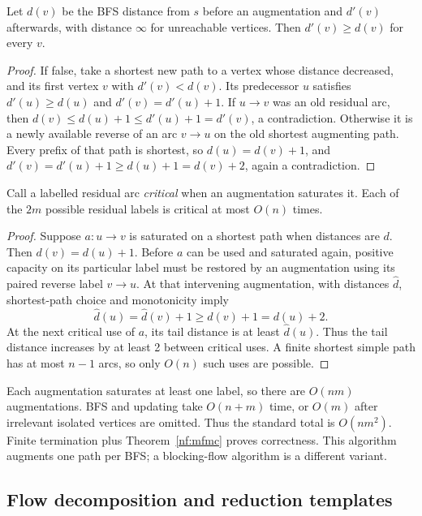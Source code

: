 \begin{lemma}\label{nf:distance}
Let $d(v)$ be the BFS distance from $s$ before an augmentation and $d'(v)$
afterwards, with distance $\infty$ for unreachable vertices. Then
$d'(v)\ge d(v)$ for every $v$.
\end{lemma}
\begin{proof}
If false, take a shortest new path to a vertex whose distance decreased,
and its first vertex $v$ with $d'(v)<d(v)$. Its predecessor $u$ satisfies
$d'(u)\ge d(u)$ and $d'(v)=d'(u)+1$. If $u\to v$ was an old residual arc,
then $d(v)\le d(u)+1\le d'(u)+1=d'(v)$, a contradiction.
Otherwise it is a newly available reverse of an arc $v\to u$ on the old
shortest augmenting path. Every prefix of that path is shortest, so
$d(u)=d(v)+1$, and
$d'(v)=d'(u)+1\ge d(u)+1=d(v)+2$, again a contradiction.
\end{proof}

\begin{lemma}\label{nf:critical}
Call a labelled residual arc \emph{critical} when an augmentation saturates
it. Each of the $2m$ possible residual labels is critical at most $O(n)$ times.
\end{lemma}
\begin{proof}
Suppose $a:u\to v$ is saturated on a shortest path when distances are $d$.
Then $d(v)=d(u)+1$. Before $a$ can be used and saturated again, positive
capacity on its particular label must be restored by an augmentation using
its paired reverse label $v\to u$. At that intervening augmentation, with
distances $\widehat d$, shortest-path choice and monotonicity imply
\[
 \widehat d(u)=\widehat d(v)+1\ge d(v)+1=d(u)+2.
\]
At the next critical use of $a$, its tail distance is at least
$\widehat d(u)$. Thus the tail distance increases by at least 2 between
critical uses. A finite shortest simple path has at most $n-1$ arcs, so only
$O(n)$ such uses are possible.
\end{proof}
Each augmentation saturates at least one label, so there are $O(nm)$
augmentations. BFS and updating take $O(n+m)$ time, or $O(m)$ after irrelevant
isolated vertices are omitted. Thus the standard total is $O(nm^2)$.
Finite termination plus Theorem~\ref{nf:mfmc} proves correctness.
This algorithm augments one path per BFS; a blocking-flow algorithm is a
different variant.

\subsection{Flow decomposition and reduction templates}\label{nf:reductions}

